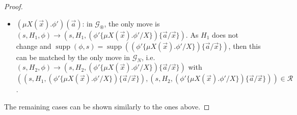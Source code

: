 \documentclass[10pt,a4paper]{article}
\theoremstyle{definition}
\theoremstyle{remark}
\DeclareMathOperator{\supp}{supp}
\newcommand\Gcal{\mathcal{G}}
\newcommand\Rcal{\mathcal{R}}
\renewcommand\S{N}
\newcommand\fgame[0]{\Gcal_\circledast}
\begin{document}
\begin{proof}
\begin{itemize}
        By definition, we know $\supp(s') \subseteq \supp(s) \cup \{\vec a\}$ and $H_1' = H_1 \cup \{\vec a\}$. 
        If $|H_1'| \le \S$, then this is matched by some move $(s,H_2,\phi) \rightarrow (s', H_2', \phi')$ with $H_2' = H_2 \cup \{\vec a\}$ and $((s', H_1', \phi'),(s',H_1',\phi')) \in \Rcal$. 
        Otherwise, we can see that $|H_2 \cup \{\vec a\}| > \S$. This can be matched by some move $(s,H_2,\phi) \rightarrow (s', H_2', \phi')$ with $H_1' \cap \supp(\phi', s') \subseteq H_2' \subseteq H_1'$ and $|H_2'| = \S + 1$. 
        As $|\supp(\phi',s')| \le \S$, we have that such a $H_2'$ exists and $((s', H_1', \phi'),(s',H_2',\phi')) \in \Rcal$ as required.
        \\
        Conversely, let $(s, H_2, \phi) \rightarrow (s', H_2', \phi')$ with $s\xrightarrow{t, \vec a} s'$. One of the following is the case:
        \begin{itemize}
            \item $|H_2 \cup \{\vec a\}| \le \S$, then $H_2' = H_1 \cup \{\vec a\}$. 
            This can be matched by the move $(s, H_1, \phi) \rightarrow (s', H_1', \phi')$ with $H_1' = H_1 \cup \{\vec a\}$ and $((s', H_1', \phi'),(s',H_2',\phi')) \in \Rcal$.
            \item $|H_2 \cup \{\vec a\}| > \S$ and $(H_2 \cup \{\vec a\}) \cap \supp(s', \phi') \subseteq H_2' \subseteq H_2 \cup \{\vec a\}$ with $|H_2'| = \S + 1$. 
            As $\supp(s') \subseteq \supp(s) \cup \{\vec a\}$ and $\supp(\phi) = \supp(\phi') \cup \{\vec a\}$, we have:
            \begin{align*}
                (H_1 \cup \{\vec a\}) \cap \supp(s', \phi') &= ((H_1\setminus\{\vec a\}) \cap \supp(s', \phi')) \cup (\{\vec a\} \cap \supp(s', \phi'))
                \\
                &\subseteq (H_2 \cap \supp(s', \phi')) \cup (\{\vec a\} \cap \supp(s', \phi'))\subseteq H_2' 
                            \end{align*}
            Thus, the move can be matched by $(s, H_1, \phi) \rightarrow (s', H_1', \phi')$ with $H_1' = H_1 \cup \{\vec a\}$ and $((s', H_1', \phi'),(s',H_2',\phi')) \in \Rcal$.
        \end{itemize}
                \item $(\mu X(\vec x).\phi')(\vec a)$: in $\fgame$, the only move is $(s, H_1, \phi) \rightarrow (s, H_1, (\phi'\{\mu X(\vec x).\phi'/X\})\{\vec a/\vec x\})$. As $H_1$ does not change and $\supp(\phi, s) = \supp((\phi'\{\mu X(\vec x).\phi'/X\})\{\vec a/\vec x\})$, then this can be matched by the only move in $\Gcal_\S$, i.e.\ $(s, H_2, \phi) \rightarrow (s, H_2, (\phi'\{\mu X(\vec x).\phi'/X\})\{\vec a/\vec x\})$ with $((s, H_1, (\phi'\{\mu X(\vec x).\phi'/X\})\{\vec a/\vec x\}), (s, H_2, (\phi'\{\mu X(\vec x).\phi'/X\})\{\vec a/\vec x\})) \in \Rcal$. 
            \end{itemize} 
The remaining cases can be shown similarly to the ones above.
  \end{proof}
\end{document}
